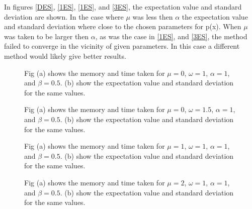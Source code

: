 \documentclass{article}
\begin{document}
In figures  \ref{DES}, \ref{1ES}, \ref{1ES}, and \ref{3ES}, the expectation value and standard deviation are shown. In the case  where $\mu$ was less then $\alpha$ the expectation value and standard deviation where close to the chosen parameters for p(x). When $\mu$ was taken to be larger then $\alpha$, as was the case in \ref{1ES}, and \ref{3ES}, the method failed to converge in the vicinity of  given parameters. In this case a different method would likely give better results. 

\begin{figure}[!ht]
\centering
{}  

\caption{Fig (a) shows the memory and time taken for $\mu=0$, $\omega=1$, $\alpha=1$, and $\beta=0.5$. (b) show the expectation value and standard deviation for the same values.}
\label{Defult}
\end{figure}

\begin{figure}[!ht]
\centering
{}  

\caption{Fig (a) shows the memory and time taken for $\mu=0$, $\omega=1.5$, $\alpha=1$, and $\beta=0.5$. (b) show the expectation value and standard deviation for the same values.}
\label{one}
\end{figure}

\begin{figure}[!ht]
\centering
{}  

\caption{Fig (a) shows the memory and time taken for $\mu=1$, $\omega=1$, $\alpha=1$, and $\beta=0.5$. (b) show the expectation value and standard deviation for the same values.}
\label{two}
\end{figure}

\begin{figure}[!ht]
\centering
{}  

\caption{Fig (a) shows the memory and time taken for $\mu=2$, $\omega=1$, $\alpha=1$, and $\beta=0.5$. (b) show the expectation value and standard deviation for the same values.}
\label{three}
\end{figure}
\end{document}
